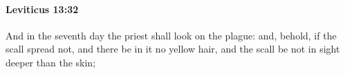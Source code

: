 
		\paragraph{Leviticus 13:32} %
			\label{LEVITICUS-13-32}

			And in the seventh day the priest shall look on the plague: and, behold, if the scall spread not, and there be in it no yellow hair, and the scall be not in sight deeper than the skin;


